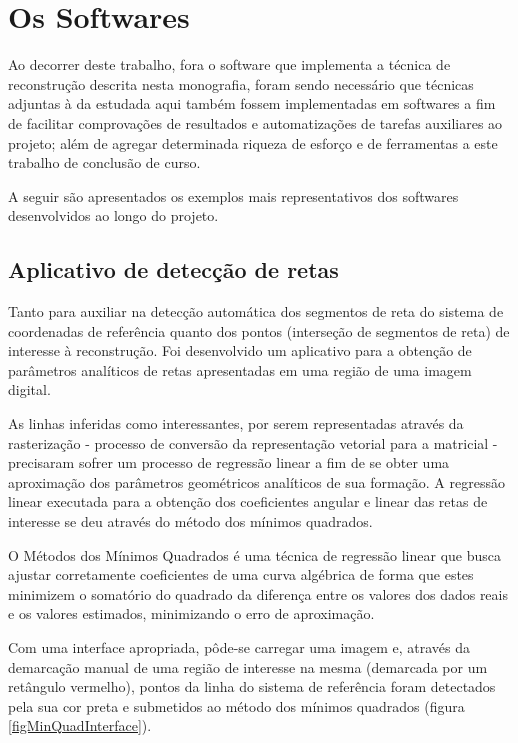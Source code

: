 \chapter{Os Softwares}
	\label{capituloSoftwares}

	Ao decorrer deste trabalho, fora o software que implementa a técnica de reconstrução descrita nesta monografia, foram sendo necessário que técnicas adjuntas à da estudada aqui também fossem implementadas em softwares a fim de facilitar comprovações de resultados e automatizações de tarefas auxiliares ao projeto; além de agregar determinada riqueza de esforço e de ferramentas a este trabalho de conclusão de curso.
	
	A seguir são apresentados os exemplos mais representativos dos softwares desenvolvidos ao longo do projeto.
	
	\section{Aplicativo de detecção de retas}
		\label{appDeteccaoRetas}
		Tanto para auxiliar na detecção automática dos segmentos de reta do sistema de coordenadas de referência quanto dos pontos (interseção de segmentos de reta) de interesse à reconstrução. Foi desenvolvido um aplicativo para a obtenção de parâmetros analíticos de retas apresentadas em uma região de uma imagem digital.
		
		As linhas inferidas como interessantes, por serem representadas através da rasterização - processo de conversão da representação vetorial para a matricial \cite{compGrafTeoPrat} - precisaram sofrer um processo de regressão linear a fim de se obter uma aproximação dos parâmetros geométricos analíticos de sua formação. A regressão linear executada para a obtenção dos coeficientes angular e linear das retas de interesse se deu através do método dos mínimos quadrados.
	
	O Métodos dos Mínimos Quadrados é uma técnica de regressão linear que busca ajustar corretamente coeficientes de uma curva algébrica de forma que estes minimizem o somatório do quadrado da diferença entre os valores dos dados reais e os valores estimados, minimizando o erro de aproximação.
	
	Com uma interface apropriada, pôde-se carregar uma imagem e, através da demarcação manual de uma região de interesse na mesma (demarcada por um retângulo vermelho), pontos da linha do sistema de referência foram detectados pela sua cor preta e submetidos ao método dos mínimos quadrados (figura \ref{figMinQuadInterface}).
	
